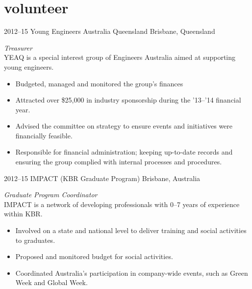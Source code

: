 \documentclass[print]{friggeri}
\begin{document}
\newpage

\section{volunteer}

\begin{entrylist}
\entry%
{2012--15}
{Young Engineers Australia Queensland}
{Brisbane, Queensland}
{\emph{Treasurer} \\
YEAQ is a special interest group of Engineers Australia aimed at supporting young engineers.
\begin{itemize}
\item Budgeted, managed and monitored the group's finances
\item Attracted over \$25,000 in industry sponsorship during the '13--'14 financial year.
\item Advised the committee on strategy to ensure events and initiatives were financially feasible.
\item Responsible for financial administration; keeping up-to-date records and ensuring the group complied with internal processes and procedures.
\end{itemize}}
\end{entrylist}

\begin{entrylist}
\entry%
{2012--15}
{IMPACT (KBR Graduate Program)}
{Brisbane, Australia}
{\emph{Graduate Program Coordinator} \\
IMPACT is a network of developing professionals with 0--7 years of experience within KBR.
\begin{itemize}
\item Involved on a state and national level to deliver training and social activities to graduates.
\item Proposed and monitored budget for social activities.
\item Coordinated Australia's participation in company-wide events, such as Green Week and Global Week.
\end{itemize}}
\end{entrylist}
\end{document}
